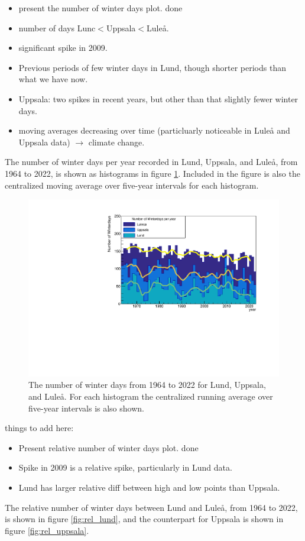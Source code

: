 \documentclass[aps,prl,groupedaddress,twocolumn]{revtex4-1}
\newcommand{\ra}{\rightarrow}
\begin{document}
\begin{itemize}\setlength\itemsep{-0.2cm}
    \item present the number of winter days plot. done
    \item number of days Lunc$<$Uppsala$<$Luleå.
    \item significant spike in 2009.
    \item Previous periods of few winter days in Lund, though shorter periods than what we have now.
    \item Uppsala: two spikes in recent years, but other than that slightly fewer winter days.
    \item moving averages decreasing over time (particluarly noticeable in Luleå and Uppsala data) $\ra$ climate change.
\end{itemize}
The number of winter days per year recorded in Lund, Uppsala, and Luleå, from 1964 to 2022, is shown as histograms in figure \ref{fig:winterdays}. Included in the figure is also the centralized moving average over five-year intervals for each histogram. 
\begin{figure}[h!]
    \includegraphics[scale=0.5,trim=0.5cm 0.3cm 0.5cm 1cm,clip]{winterday_hist.pdf}
    \caption{The number of winter days from 1964 to 2022 for Lund, Uppsala, and Luleå. For each histogram the centralized running average over five-year intervals is also shown.}
    \label{fig:winterdays}
\end{figure}

things to add here:

\begin{itemize}\setlength\itemsep{-0.2cm}
    \item Present relative number of winter days plot. done
    \item Spike in 2009 is a relative spike, particularly in Lund data.
    \item Lund has larger relative diff between high and low points than Uppsala.
\end{itemize}
The relative number of winter days between Lund and Luleå, from 1964 to 2022, is shown in figure \ref{fig:rel_lund}, and the counterpart for Uppsala is shown in figure \ref{fig:rel_uppsala}.
\end{document}
